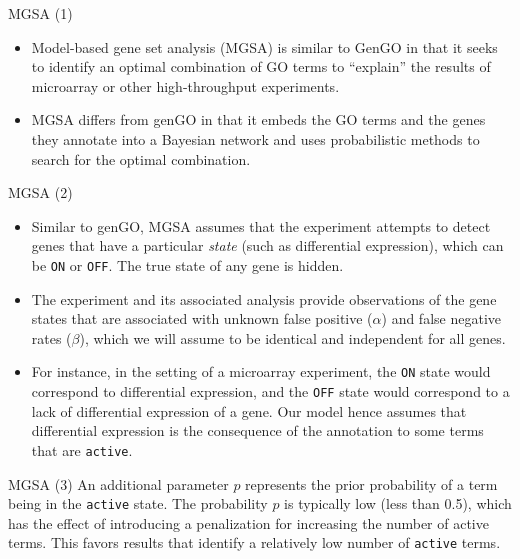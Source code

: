 \documentclass{beamer}
\begin{document}
\begin{frame}[fragile]{MGSA (1)}

\begin{itemize}
 \item Model-based gene set analysis (MGSA) is similar to
GenGO in that it seeks to identify an optimal combination of GO terms
to ``explain'' the results of microarray or other high-throughput
experiments. 
\item MGSA differs from genGO in that it embeds the GO terms and
the genes they annotate into a Bayesian network and uses probabilistic
methods to search for the optimal combination. 
\end{itemize}

\end{frame}
\begin{frame}[fragile]{MGSA (2)}
 \begin{itemize}
  \item 
Similar to genGO, MGSA assumes that the experiment attempts to detect genes that have a particular
\emph{state} (such as differential expression),
which can be \texttt{ON} or \texttt{OFF}. The true state of any gene is hidden. 
\item The
experiment and its associated analysis provide observations of the gene states
that are associated with unknown  false positive ($\alpha$) and  false negative rates
($\beta$), which we will assume to be identical and independent for all genes.

\item For instance, in the setting of a microarray experiment, the \texttt{ON} state
would correspond to differential expression, and the \texttt{OFF} state would
correspond to a lack of differential expression of a gene. Our model hence
assumes that differential expression is the consequence of the
annotation to some terms that are \texttt{active}.
 \end{itemize}

\end{frame}
\begin{frame}[fragile]{MGSA (3)}
 An additional parameter $p$ represents the prior probability of a term being
in the \texttt{active} state. The probability $p$ is typically low (less
than 0.5), which has the effect of introducing a penalization for
increasing the number of active terms. This favors results that
identify a relatively low number of \texttt{active} terms.
\end{frame}
\end{document}
